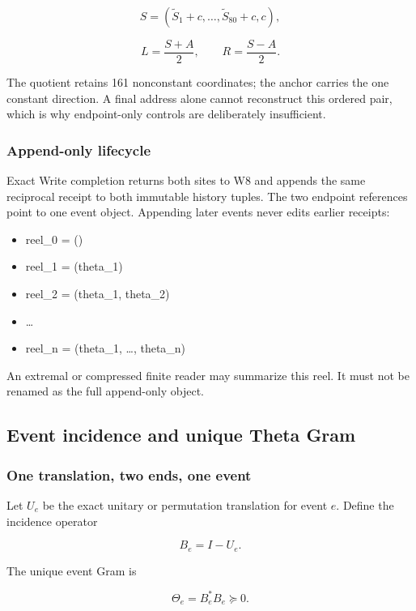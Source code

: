 \[
S=(\widetilde S_1+c,\ldots,\widetilde S_{80}+c,c),
\]

\[
L=\frac{S+A}{2},
\qquad
R=\frac{S-A}{2}.
\]

The quotient retains 161 nonconstant coordinates; the anchor carries the
one constant direction. A final address alone cannot reconstruct this
ordered pair, which is why endpoint-only controls are deliberately
insufficient.

\subsubsection{Append-only lifecycle}\label{viii-ch06-append-only-lifecycle}

Exact Write completion returns both sites to W8 and appends the same
reciprocal receipt to both immutable history tuples. The two endpoint
references point to one event object. Appending later events never edits
earlier receipts:

\begin{itemize}
\tightlist
\item
  reel\_0 = ()
\item
  reel\_1 = (theta\_1)
\item
  reel\_2 = (theta\_1, theta\_2)
\item
  \ldots{}
\item
  reel\_n = (theta\_1, \ldots, theta\_n)
\end{itemize}

An extremal or compressed finite reader may summarize this reel. It must
not be renamed as the full append-only object.

\subsection{Event incidence and unique Theta
Gram}\label{viii-ch06-event-incidence-and-unique-theta-gram}

\subsubsection{One translation, two ends, one
event}\label{viii-ch06-one-translation-two-ends-one-event}

Let \(U_e\) be the exact unitary or permutation translation for event
\(e\). Define the incidence operator

\[
B_e=I-U_e.
\]

The unique event Gram is

\[
\Theta_e=B_e^*B_e\succeq0.
\]

